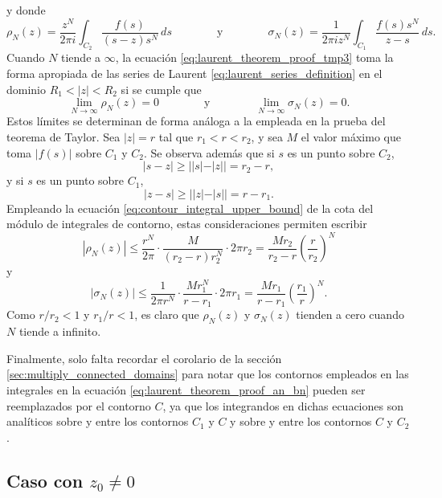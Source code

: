 \documentclass[a4paper]{report}
\begin{document}
y donde
\[
 \rho_N(z)=\frac{z^N}{2\pi i}\int_{C_2}\frac{f(s)}{(s-z)s^N}\,ds
 \qquad\qquad\textrm{y}\qquad\qquad
 \sigma_N(z)=\frac{1}{2\pi iz^N}\int_{C_1}\frac{f(s)s^N}{z-s}\,ds.
\]
Cuando \(N\) tiende a \(\infty\), la ecuación \ref{eq:laurent_theorem_proof_tmp3} toma la forma apropiada de las series de Laurent \ref{eq:laurent_series_definition} en el dominio \(R_1<|z|<R_2\) si se cumple que 
\[
 \lim_{N\to\infty}\rho_N(z)=0
 \qquad\qquad\textrm{y}\qquad\qquad
 \lim_{N\to\infty}\sigma_N(z)=0.
\]
Estos límites se determinan de forma análoga a la empleada en la prueba del teorema de Taylor. Sea \(|z|=r\) tal que \(r_1<r<r_2\), y sea \(M\) el valor máximo que toma \(|f(s)|\) sobre \(C_1\) y \(C_2\). Se observa además que si \(s\) es un punto sobre \(C_2\),
\[
 |s-z|\geq||s|-|z||=r_2-r,
\]
y si \(s\) es un punto sobre \(C_1\),
\[
 |z-s|\geq||z|-|s||=r-r_1.
\]
Empleando la ecuación \ref{eq:contour_integral_upper_bound} de la cota del módulo de integrales de contorno, estas consideraciones permiten escribir
\[
 |\rho_N(z)|\leq\frac{r^N}{2\pi}\cdot\frac{M}{(r_2-r)r_2^N}\cdot2\pi r_2=\frac{Mr_2}{r_2-r}\left(\frac{r}{r_2}\right)^N 
\]
y
\[
 |\sigma_N(z)|\leq\frac{1}{2\pi r^N}\cdot\frac{Mr_1^N}{r-r_1}\cdot2\pi r_1=\frac{Mr_1}{r-r_1}\left(\frac{r_1}{r}\right)^N. 
\]
Como \(r/r_2<1\) y \(r_1/r<1\), es claro que \(\rho_N(z)\) y \(\sigma_N(z)\) tienden a cero cuando \(N\) tiende a infinito.

Finalmente, solo falta recordar el corolario de la sección \ref{sec:multiply_connected_domains} para notar que los contornos empleados en las integrales en la ecuación \ref{eq:laurent_theorem_proof_an_bn} pueden ser reemplazados por el contorno \(C\), ya que los integrandos en dichas ecuaciones son analíticos sobre y entre los contornos \(C_1\) y \(C\) y sobre y entre los contornos \(C\) y \(C_2\).

\subsection*{Caso con \(z_0\neq0\)}
\end{document}
